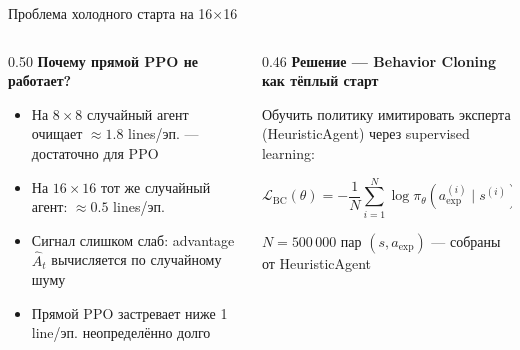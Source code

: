 \documentclass[aspectratio=169]{beamer}
\begin{document}
	\begin{frame}{Проблема холодного старта на 16×16}
		\begin{columns}[t]
			\begin{column}{0.50\textwidth}
				\textbf{Почему прямой PPO не работает?}

				\medskip
				\begin{itemize}
					\item На $8\times8$ случайный агент очищает $\approx1.8$ lines/эп. — достаточно для PPO
					\item На $16\times16$ тот же случайный агент: $\approx0.5$ lines/эп.
					\item Сигнал слишком слаб: advantage $\hat{A}_t$ вычисляется по случайному шуму
					\item Прямой PPO застревает ниже 1 line/эп. неопределённо долго
				\end{itemize}
			\end{column}
			\begin{column}{0.46\textwidth}
				\textbf{Решение — Behavior Cloning как тёплый старт}

				\medskip
				Обучить политику имитировать эксперта (HeuristicAgent) через supervised learning:

				\[
					\mathcal{L}_{\text{BC}}(\theta) = -\frac{1}{N}\sum_{i=1}^{N} \log \pi_\theta\!\left(a^{(i)}_{\text{exp}} \mid s^{(i)}\right)
				\]

				\medskip
				$N = 500\,000$ пар $(s, a_{\text{exp}})$ — собраны от HeuristicAgent
			\end{column}
		\end{columns}
	\end{frame}
\end{document}

